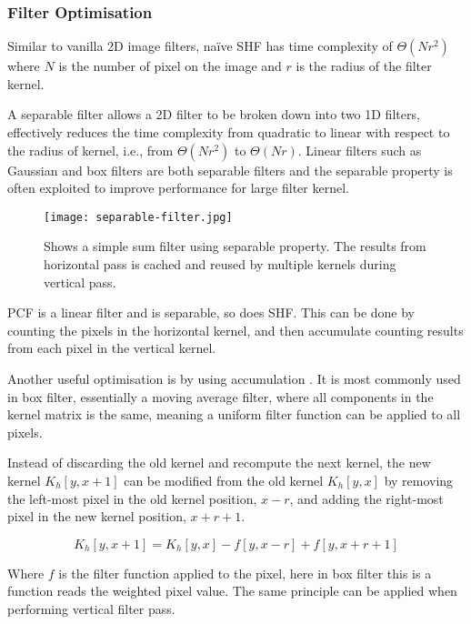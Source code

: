 \documentclass[oneside, a4paper]{report}
\begin{document}
    \subsubsection{Filter Optimisation}

    Similar to vanilla 2D image filters, naïve SHF has time complexity of \(\Theta(Nr^{2})\) where $N$ is the number of pixel on the image and $r$ is the radius of the filter kernel.

    A separable filter allows a 2D filter to be broken down into two 1D filters, effectively reduces the time complexity from quadratic to linear with respect to the radius of kernel, i.e., from \(\Theta(Nr^{2})\) to \(\Theta(Nr)\). Linear filters such as Gaussian and box filters are both separable filters and the separable property is often exploited to improve performance for large filter kernel.

    \begin{figure}[H]
        \center
        \texttt{[image: separable-filter.jpg]}
        \caption{Shows a simple sum filter using separable property. The results from horizontal pass is cached and reused by multiple kernels during vertical pass.}
    \end{figure}

    PCF is a linear filter and is separable, so does SHF. This can be done by counting the pixels in the horizontal kernel, and then accumulate counting results from each pixel in the vertical kernel.

    Another useful optimisation is by using accumulation \cite{fast_blur}. It is most commonly used in box filter, essentially a moving average filter, where all components in the kernel matrix is the same, meaning a uniform filter function can be applied to all pixels.

    Instead of discarding the old kernel and recompute the next kernel, the new kernel \(K_{h}[y, x + 1]\) can be modified from the old kernel \(K_{h}[y, x]\) by removing the left-most pixel in the old kernel position, \(x - r\), and adding the right-most pixel in the new kernel position, \(x + r + 1\).

    \begin{equation}
        K_{h}[y, x + 1] = K_{h}[y, x] - f[y, x - r] + f[y, x + r + 1]
    \end{equation}

    Where \(f\) is the filter function applied to the pixel, here in box filter this is a function reads the weighted pixel value. The same principle can be applied when performing vertical filter pass.
\end{document}
